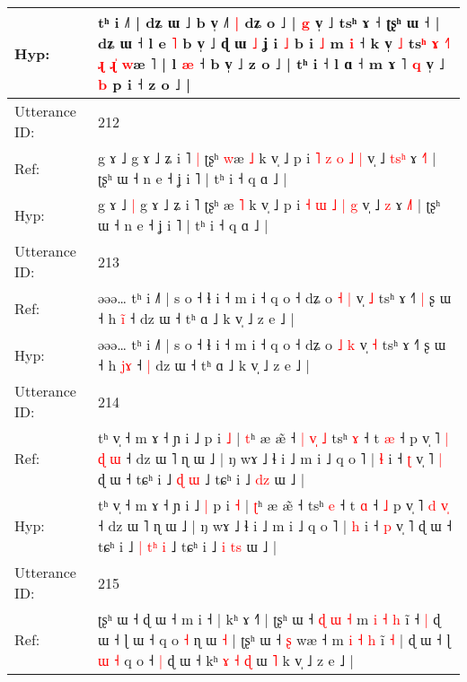 \documentclass[10pt]{article}
\DeclareRobustCommand{\hl}[1]{{\textcolor{red}{#1}}}
\begin{document}
\begin{longtable}{ll}
 \\
Hyp: & tʰ i ˩˥ | dʑ ɯ ˩ b v̩ ˩˥\hl{ }\hl{|} dʑ o ˩ |\hl{ }\hl{g} v̩ ˩ tsʰ ɤ ˧ ʈʂʰ ɯ ˧ | dʑ ɯ ˧\hl{}\hl{} l e \hl{˥} b v̩ ˩\hl{}\hl{} ɖ ɯ \hl{˩} ʝ i \hl{˩} b i \hl{˩} m \hl{i} ˧ k v̩ \hl{˩} ts\hl{}\hl{}\hl{}\hl{ʰ} \hl{ɤ} \hl{}\hl{}\hl{˧}\hl{˥} \hl{}\hl{}\hl{ɻ} \hl{}\hl{ɻ}\hl{̍} \hl{}\hl{w}æ \hl{}˥ | l \hl{æ} ˧ b v̩ ˩ z o ˩ | tʰ i ˧ l ɑ ˧ m ɤ ˥ \hl{q} v̩ ˩ \hl{b} p i ˧ z o ˩ |
 \\
\midrule
Utterance ID: & 212 \\
Ref: & g ɤ ˩\hl{}\hl{} g ɤ ˩ ʑ i ˥\hl{ }\hl{|} ʈʂʰ \hl{w}æ \hl{˩} k v̩ ˩ p i \hl{˥} \hl{z} \hl{o} \hl{˩} \hl{|} v̩ ˩ \hl{t}\hl{s}\hl{ʰ} ɤ \hl{˧}˥ | ʈʂʰ ɯ ˧ n e ˧ ʝ i ˥ | tʰ i ˧ q ɑ ˩ |
 \\
Hyp: & g ɤ ˩\hl{ }\hl{|} g ɤ ˩ ʑ i ˥\hl{}\hl{} ʈʂʰ \hl{}æ \hl{˥} k v̩ ˩ p i \hl{˧} \hl{ɯ} \hl{˩} \hl{|} \hl{g} v̩ ˩ \hl{}\hl{}\hl{z} ɤ \hl{˩}˥ | ʈʂʰ ɯ ˧ n e ˧ ʝ i ˥ | tʰ i ˧ q ɑ ˩ |
 \\
\midrule
Utterance ID: & 213 \\
Ref: & əəə… tʰ i ˩˥ | s o ˧ ɬ i ˧ m i ˧ q o ˧ dʑ o \hl{˧} \hl{|} v̩ \hl{˩} tsʰ ɤ ˧˥\hl{ }\hl{|} ʂ ɯ ˧ h \hl{i}\hl{̃} ˧\hl{}\hl{} dz ɯ ˧ tʰ ɑ ˩ k v̩ ˩ z e ˩ |
 \\
Hyp: & əəə… tʰ i ˩˥ | s o ˧ ɬ i ˧ m i ˧ q o ˧ dʑ o \hl{˩} \hl{k} v̩ \hl{˧} tsʰ ɤ ˧˥\hl{}\hl{} ʂ ɯ ˧ h \hl{j}\hl{ɤ} ˧\hl{ }\hl{|} dz ɯ ˧ tʰ ɑ ˩ k v̩ ˩ z e ˩ |
 \\
\midrule
Utterance ID: & 214 \\
Ref: & tʰ v̩ ˧ m ɤ ˧ ɲ i ˩\hl{}\hl{} p i \hl{˩} | \hl{t}ʰ æ æ̃ ˧\hl{ }\hl{|}\hl{ }\hl{v}\hl{̩}\hl{ }\hl{˩} tsʰ \hl{ɤ} ˧ t \hl{æ} ˧\hl{}\hl{} p v̩ ˥ \hl{|} \hl{ɖ}\hl{ }\hl{ɯ} ˧ dz ɯ ˥ ɳ ɯ ˩ | ŋ wɤ ˩ ɬ i ˩ m i ˩ q o ˥ | \hl{ɬ} i ˧ \hl{ʈ} v̩ ˥\hl{ }\hl{|} ɖ ɯ ˧ tɕʰ i ˩\hl{}\hl{} \hl{}\hl{ɖ} \hl{ɯ} ˩ tɕʰ i ˩\hl{}\hl{} \hl{d}\hl{z} ɯ ˩ |
 \\
Hyp: & tʰ v̩ ˧ m ɤ ˧ ɲ i ˩\hl{ }\hl{|} p i \hl{˧} | \hl{ʈ}ʰ æ æ̃ ˧\hl{}\hl{}\hl{}\hl{}\hl{}\hl{}\hl{} tsʰ \hl{e} ˧ t \hl{ɑ} ˧\hl{ }\hl{˩} p v̩ ˥ \hl{d} \hl{}\hl{v}\hl{̩} ˧ dz ɯ ˥ ɳ ɯ ˩ | ŋ wɤ ˩ ɬ i ˩ m i ˩ q o ˥ | \hl{h} i ˧ \hl{p} v̩ ˥\hl{}\hl{} ɖ ɯ ˧ tɕʰ i ˩\hl{ }\hl{|} \hl{t}\hl{ʰ} \hl{i} ˩ tɕʰ i ˩\hl{ }\hl{i} \hl{t}\hl{s} ɯ ˩ |
 \\
\midrule
Utterance ID: & 215 \\
Ref: & ʈʂʰ ɯ ˧ ɖ ɯ ˧ m i ˧ | kʰ ɤ ˧˥ | ʈʂʰ ɯ ˧ \hl{ɖ} \hl{ɯ} \hl{˧} m\hl{ }\hl{i}\hl{ }\hl{˧}\hl{ }\hl{h} i\hl{̃} ˧\hl{ }\hl{|} ɖ ɯ ˧ ɭ ɯ ˧ q o \hl{˧} ɳ ɯ \hl{˧} | ʈʂʰ ɯ ˧ \hl{}\hl{ʂ} wæ ˧ m\hl{ }\hl{i}\hl{ }\hl{˧}\hl{ }\hl{h} i\hl{̃} \hl{˧} | ɖ ɯ ˧ ɭ\hl{ }\hl{ɯ}\hl{ }\hl{˧} q o ˧\hl{ }\hl{|} ɖ ɯ ˧ kʰ \hl{ɤ} \hl{˧} \hl{ɖ} ɯ \hl{˥} k v̩ ˩ z e ˩ |

\end{longtable}
\end{document}

